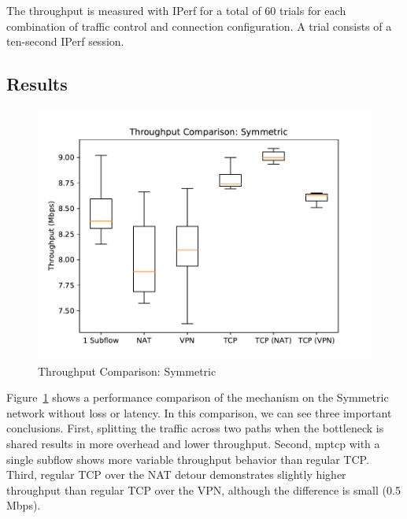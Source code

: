 \documentclass{cwru}
\begin{document}
The throughput is measured with IPerf for a total of 60 trials for each
combination of traffic control and connection configuration. A trial consists of
a ten-second IPerf session.

\subsection{Results}

\begin{figure}
  \centering
  \includegraphics[height=0.45\textheight]{figures/sym.pdf}
  \caption{Throughput Comparison: Symmetric}
  \label{fig:sym}
\end{figure}

Figure~\ref{fig:sym} shows a performance comparison of the mechanism on the
Symmetric network without loss or latency. In this comparison, we can see three
important conclusions. First, splitting the traffic across two paths when the
bottleneck is shared results in more overhead and lower throughput. Second,
\ac{mptcp} with a single subflow shows more variable throughput behavior than
regular TCP. Third, regular TCP over the NAT detour demonstrates slightly higher
throughput than regular TCP over the VPN, although the difference is small (0.5
Mbps).
\end{document}
